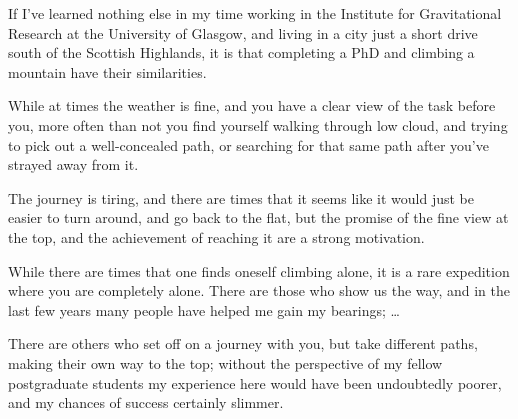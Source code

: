 If I've learned nothing else in my time working in the Institute for Gravitational Research at the University of Glasgow, 
and living in a city just a short drive south of the Scottish Highlands, 
it is that completing a PhD and climbing a mountain have their similarities.

While at times the weather is fine, and you have a clear view of the task before you,
more often than not you find yourself walking through low cloud, and trying to pick out a 
well-concealed path, or searching for that same path after you've strayed away from it.

The journey is tiring, and there are times that it seems like it would just be easier to turn around, and go back to the flat,
but the promise of the fine view at the top, and the achievement of reaching it are a strong motivation.

While there are times that one finds oneself climbing alone, it is a rare expedition where you are completely alone.
There are those who show us the way, and in the last few years many people have helped me gain my bearings; 
\ldots{}

There are others who set off on a journey with you, but take different paths, making their own way to the top; 
without the perspective of my fellow postgraduate students my experience here would have been undoubtedly poorer,
and my chances of success certainly slimmer.
